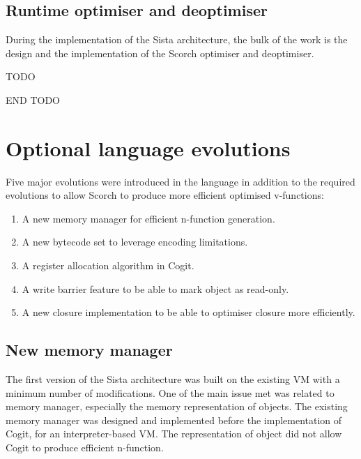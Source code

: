 \documentclass[a4paper,12pt,twoside]{../includes/ThesisStyle}
\begin{document}
\subsection{Runtime optimiser and deoptimiser}

During the implementation of the Sista architecture, the bulk of the work is the design and the implementation of the Scorch optimiser and deoptimiser. 

TODO



END TODO


\section{Optional language evolutions}


Five major evolutions were introduced in the language in addition to the required evolutions to allow Scorch to produce more efficient optimised v-functions:
\begin{enumerate}
	\item A new memory manager for efficient n-function generation.
	\item A new bytecode set to leverage encoding limitations.
	\item A register allocation algorithm in Cogit.
	\item A write barrier feature to be able to mark object as read-only.
	\item A new closure implementation to be able to optimiser closure more efficiently.
\end{enumerate}

\subsection{New memory manager}

The first version of the Sista architecture was built on the existing VM with a minimum number of modifications. One of the main issue met was related to memory manager, especially the memory representation of objects. The existing memory manager was designed and implemented before the implementation of Cogit, for an interpreter-based VM. The representation of object did not allow Cogit to produce efficient n-function.
\end{document}
